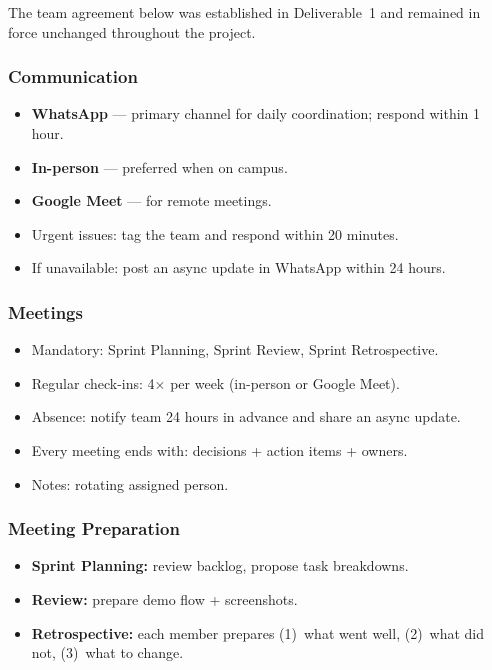 \documentclass[12pt, a4paper]{article}
\begin{document}
The team agreement below was established in Deliverable~1 and remained in force
unchanged throughout the project.

\subsubsection*{Communication}
\begin{itemize}
  \item \textbf{WhatsApp} --- primary channel for daily coordination; respond within 1 hour.
  \item \textbf{In-person} --- preferred when on campus.
  \item \textbf{Google Meet} --- for remote meetings.
  \item Urgent issues: tag the team and respond within 20 minutes.
  \item If unavailable: post an async update in WhatsApp within 24 hours.
\end{itemize}

\subsubsection*{Meetings}
\begin{itemize}
  \item Mandatory: Sprint Planning, Sprint Review, Sprint Retrospective.
  \item Regular check-ins: 4$\times$ per week (in-person or Google Meet).
  \item Absence: notify team 24 hours in advance and share an async update.
  \item Every meeting ends with: decisions + action items + owners.
  \item Notes: rotating assigned person.
\end{itemize}

\subsubsection*{Meeting Preparation}
\begin{itemize}
  \item \textbf{Sprint Planning:} review backlog, propose task breakdowns.
  \item \textbf{Review:} prepare demo flow + screenshots.
  \item \textbf{Retrospective:} each member prepares (1)~what went well,
        (2)~what did not, (3)~what to change.
\end{itemize}
\end{document}
